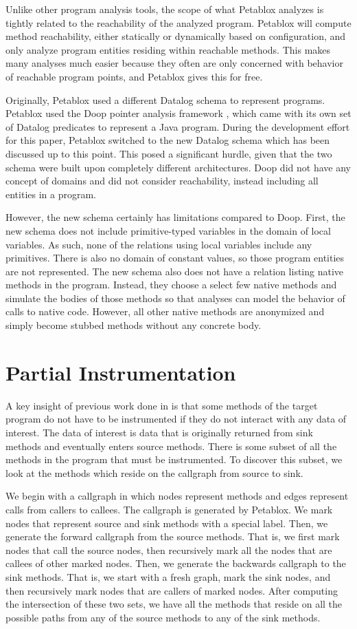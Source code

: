 Unlike other program analysis tools, the scope of what Petablox
analyzes is tightly related to the reachability of the analyzed
program. Petablox will compute method reachability, either statically
or dynamically based on configuration, and only analyze program
entities residing within reachable methods. This makes many analyses
much easier because they often are only concerned with behavior of
reachable program points, and Petablox gives this for free.

Originally, Petablox used a different Datalog schema to represent
programs. Petablox used the Doop pointer analysis framework
\cite{doop}, which came with its own set of Datalog predicates to
represent a Java program. During the development effort for this
paper, Petablox switched to the new Datalog schema which has been
discussed up to this point. This posed a significant hurdle, given
that the two schema were built upon completely different
architectures. Doop did not have any concept of domains and did not
consider reachability, instead including all entities in a program.

However, the new schema certainly has limitations compared to
Doop. First, the new schema does not include primitive-typed variables
in the domain of local variables. As such, none of the relations using
local variables include any primitives. There is also no domain of
constant values, so those program entities are not represented. The
new schema also does not have a relation listing native methods in the
program. Instead, they choose a select few native methods and simulate
the bodies of those methods so that analyses can model the behavior of
calls to native code. However, all other native methods are anonymized
and simply become stubbed methods without any concrete body.
\section{Partial Instrumentation}
A key insight of previous work done in \cite{manoj_project} is that
some methods of the target program do not have to be instrumented if
they do not interact with any data of interest. The data of interest
is data that is originally returned from sink methods and eventually
enters source methods. There is some subset of all the methods in the
program that must be instrumented. To discover this subset, we look at
the methods which reside on the callgraph from source to sink.

We begin with a callgraph in which nodes represent methods and edges
represent calls from callers to callees. The callgraph is generated by
Petablox. We mark nodes that represent source and sink methods with a
special label. Then, we generate the forward callgraph from the source
methods. That is, we first mark nodes that call the source nodes, then
recursively mark all the nodes that are callees of other marked
nodes. Then, we generate the backwards callgraph to the sink
methods. That is, we start with a fresh graph, mark the sink nodes,
and then recursively mark nodes that are callers of marked
nodes. After computing the intersection of these two sets, we have all
the methods that reside on all the possible paths from any of the
source methods to any of the sink methods.

